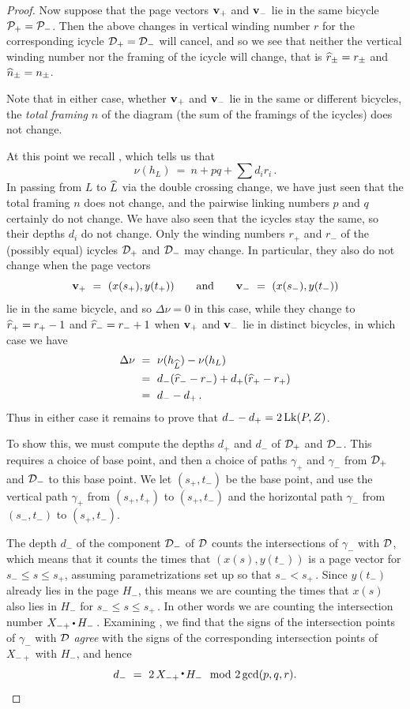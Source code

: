 \begin{proof}
Now suppose that the page vectors $\textup{\bf v}_+$ and $\textup{\bf v}_-$ lie in the same bicycle $\mathcal P_+ = \mathcal P_-$.  Then the above changes in vertical winding number $r$ for the corresponding icycle $\mathcal D_+=\mathcal D_-$ will cancel, and so we see that neither the vertical winding number nor the framing of the icycle will change, that is $\widehat{r}_\pm = r_\pm$ and $\widehat{n}_\pm = n_\pm$.

Note that in either case, whether $\textup{\bf v}_+$ and $\textup{\bf v}_-$ lie in the same or different bicycles, the {\it total framing} $n$ of the diagram (the sum of the framings of the icycles) does not change.

At this point we recall , which tells us that 
$$ 
\nu(h_L)  \ = \  n  +  p q  +  \textstyle\sum d_i r_i\,. 
$$
In passing from $L$  to  $\widehat{L}$ via the double crossing change, we have just seen that the total framing $n$ does not change, and the pairwise linking numbers $p$ and $q$ certainly do not change.  We have also seen that the icycles stay the same, so their depths $d_i$ do not change.  Only the winding numbers $r_+$ and $r_-$ of the (possibly equal) icycles $\mathcal D_+$ and $\mathcal D_-$ may change.  In particular, they also do not change when the page vectors
$$
\textup{\bf v}_+ \ = \ (x(s_+), y(t_+)) \qquad\text{and}\qquad \textup{\bf v}_- \ = \ (x(s_-), y(t_-))
$$ 
lie in the same bicycle, and so $\Delta\nu = 0$ in this case, while they change to $\widehat{r}_+ = r_+ - 1$ and $\widehat{r}_- = r_- + 1$ when $\textup{\bf v}_+$ and $\textup{\bf v}_-$ lie in distinct bicycles, in which case we have
$$
\begin{aligned}
\Delta\nu \ &= \  \nu(h_{\widehat{L}}) - \nu(h_L) \\
\ &= \ d_-(\widehat{r}_- - r_-) + d_+(\widehat{r}_+ - r_+) \\
\ &= \ d_- - d_+\,.
\end{aligned}
$$
Thus in either case it remains to prove that $d_- - d_+ = 2\,\mathrm{Lk}(P,Z)$. 

To show this, we must compute the depths $d_+$ and $d_-$ of $\mathcal D_+$ and $\mathcal D_-$.  This requires a choice of base point, and then a choice of paths $\gamma_+$ and  $\gamma_-$ from $\mathcal D_+$ and $\mathcal D_-$ to this base point.  We let $(s_+,t_-)$ be the base point, and use the vertical path $\gamma_+$ from $(s_+,t_+)$ to $(s_+,t_-)$ and the horizontal path $\gamma_-$ from $(s_-,t_-)$ to $(s_+,t_-)$.  

The depth $d_-$ of the component $\mathcal D_-$ of $\mathcal D$ counts the intersections of $\gamma_-$ with $\mathcal D$, which means that it counts the times that $(x(s),y(t_-))$ is a page vector for $s_-\le s\le s_+$, assuming parametrizations set up so that $s_-<s_+$\,.  Since $y(t_-)$ already lies in the page $H_-$, this means we are counting the times that $x(s)$ also lies in $H_-$ for $s_-\le s\le s_+$\,.  In other words we are counting the intersection number $X_{-+}\dt H_-$\,.  Examining , we find that the signs of the intersection  points of $\gamma_-$ with $\mathcal D$ {\it agree} with the signs of the corresponding intersection points of $X_{-+}$ with $H_-$, and hence
$$
d_- \ = \ 2\, X_{-+} \dth H_- \mod{2\gcd(p,q,r)}.
$$



\end{proof}
